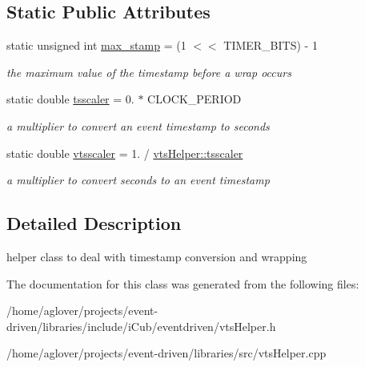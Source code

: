 \subsection*{Static Public Attributes}
\begin{DoxyCompactItemize}
\item 
static unsigned int \hyperlink{classev_1_1vtsHelper_a059fdcf455b471e69446e565ed017f65}{max\+\_\+stamp} = (1 $<$$<$ T\+I\+M\+E\+R\+\_\+\+B\+I\+TS) -\/ 1\hypertarget{classev_1_1vtsHelper_a059fdcf455b471e69446e565ed017f65}{}\label{classev_1_1vtsHelper_a059fdcf455b471e69446e565ed017f65}

\begin{DoxyCompactList}\small\item\em the maximum value of the timestamp before a wrap occurs \end{DoxyCompactList}\item 
static double \hyperlink{classev_1_1vtsHelper_ad3ad427d18c24f9655bbc73295abf678}{tsscaler} = 0. $\ast$ C\+L\+O\+C\+K\+\_\+\+P\+E\+R\+I\+OD\hypertarget{classev_1_1vtsHelper_ad3ad427d18c24f9655bbc73295abf678}{}\label{classev_1_1vtsHelper_ad3ad427d18c24f9655bbc73295abf678}

\begin{DoxyCompactList}\small\item\em a multiplier to convert an event timestamp to seconds \end{DoxyCompactList}\item 
static double \hyperlink{classev_1_1vtsHelper_afa2dd46ae7113668bc6ebea88ab8fa11}{vtsscaler} = 1. / \hyperlink{classev_1_1vtsHelper_ad3ad427d18c24f9655bbc73295abf678}{vts\+Helper\+::tsscaler}\hypertarget{classev_1_1vtsHelper_afa2dd46ae7113668bc6ebea88ab8fa11}{}\label{classev_1_1vtsHelper_afa2dd46ae7113668bc6ebea88ab8fa11}

\begin{DoxyCompactList}\small\item\em a multiplier to convert seconds to an event timestamp \end{DoxyCompactList}\end{DoxyCompactItemize}


\subsection{Detailed Description}
helper class to deal with timestamp conversion and wrapping 

The documentation for this class was generated from the following files\+:\begin{DoxyCompactItemize}
\item 
/home/aglover/projects/event-\/driven/libraries/include/i\+Cub/eventdriven/vts\+Helper.\+h\item 
/home/aglover/projects/event-\/driven/libraries/src/vts\+Helper.\+cpp\end{DoxyCompactItemize}
